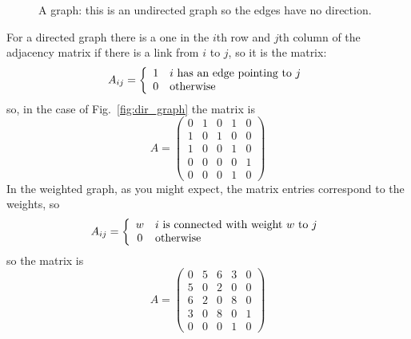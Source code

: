 \documentclass[11pt,a4paper]{scrartcl}
\begin{document}
\begin{figure}
\begin{center}
\end{center}
\caption{A graph: this is an undirected graph so the edges have no
  direction. \label{fig:graph}}
\end{figure}

For a directed graph there is a one in the $i$th row and $j$th column of the adjacency matrix if there is a link from $i$ to $j$, so it is the matrix:
\begin{equation}
A_{ij}=\left\{\begin{array}{cl}1&i\mbox{ has an edge pointing to }j\cr0&\mbox{otherwise}
\end{array}\right.
\end{equation}
so, in the case of Fig.~\ref{fig:dir_graph} the matrix is 
\begin{equation}
A=\left(
\begin{array}{ccccc}
0&1&0&1&0\\
1&0&1&0&0\\
1&0&0&1&0\\
0&0&0&0&1\\
0&0&0&1&0
\end{array}
\right)
\end{equation}
In the weighted graph, as you might expect, the matrix entries correspond to the weights, so
\begin{equation}
A_{ij}=\left\{
\begin{array}{cl}
w&i\mbox{ is connected with weight }w\mbox{ to }j\cr 
0&\mbox{otherwise}
\end{array}\right.
\end{equation}
so the matrix is
\begin{equation}
A=\left(
\begin{array}{ccccc}
0&5&6&3&0\\
5&0&2&0&0\\
6&2&0&8&0\\
3&0&8&0&1\\
0&0&0&1&0
\end{array}
\right)
\end{equation}
\end{document}
